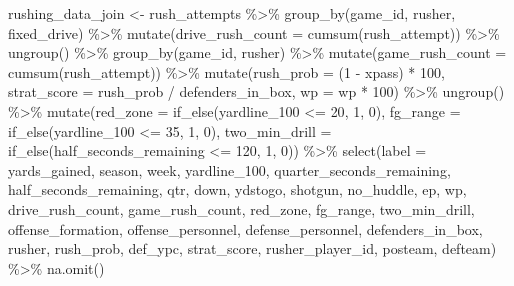 \documentclass[
  letterpaper,
]{krantz}
\newenvironment{Shaded}{\begin{snugshade}}{\end{snugshade}}
\newcommand{\AttributeTok}[1]{\textcolor[rgb]{0.40,0.45,0.13}{#1}}
\newcommand{\DecValTok}[1]{\textcolor[rgb]{0.68,0.00,0.00}{#1}}
\newcommand{\FunctionTok}[1]{\textcolor[rgb]{0.28,0.35,0.67}{#1}}
\newcommand{\NormalTok}[1]{\textcolor[rgb]{0.00,0.23,0.31}{#1}}
\newcommand{\OtherTok}[1]{\textcolor[rgb]{0.00,0.23,0.31}{#1}}
\newcommand{\SpecialCharTok}[1]{\textcolor[rgb]{0.37,0.37,0.37}{#1}}
\begin{document}
\begin{Shaded}
\begin{Highlighting}[]
\NormalTok{rushing\_data\_join }\OtherTok{\textless{}{-}}\NormalTok{ rush\_attempts }\SpecialCharTok{\%\textgreater{}\%}
  \FunctionTok{group\_by}\NormalTok{(game\_id, rusher, fixed\_drive) }\SpecialCharTok{\%\textgreater{}\%}
  \FunctionTok{mutate}\NormalTok{(}\AttributeTok{drive\_rush\_count =} \FunctionTok{cumsum}\NormalTok{(rush\_attempt)) }\SpecialCharTok{\%\textgreater{}\%}
  \FunctionTok{ungroup}\NormalTok{() }\SpecialCharTok{\%\textgreater{}\%}
  \FunctionTok{group\_by}\NormalTok{(game\_id, rusher) }\SpecialCharTok{\%\textgreater{}\%}
  \FunctionTok{mutate}\NormalTok{(}\AttributeTok{game\_rush\_count =} \FunctionTok{cumsum}\NormalTok{(rush\_attempt)) }\SpecialCharTok{\%\textgreater{}\%}
  \FunctionTok{mutate}\NormalTok{(}\AttributeTok{rush\_prob =}\NormalTok{ (}\DecValTok{1} \SpecialCharTok{{-}}\NormalTok{ xpass) }\SpecialCharTok{*} \DecValTok{100}\NormalTok{,}
         \AttributeTok{strat\_score =}\NormalTok{ rush\_prob }\SpecialCharTok{/}\NormalTok{ defenders\_in\_box,}
         \AttributeTok{wp =}\NormalTok{ wp }\SpecialCharTok{*} \DecValTok{100}\NormalTok{) }\SpecialCharTok{\%\textgreater{}\%}
  \FunctionTok{ungroup}\NormalTok{() }\SpecialCharTok{\%\textgreater{}\%}
  \FunctionTok{mutate}\NormalTok{(}\AttributeTok{red\_zone =} \FunctionTok{if\_else}\NormalTok{(yardline\_100 }\SpecialCharTok{\textless{}=} \DecValTok{20}\NormalTok{, }\DecValTok{1}\NormalTok{, }\DecValTok{0}\NormalTok{),}
         \AttributeTok{fg\_range =} \FunctionTok{if\_else}\NormalTok{(yardline\_100 }\SpecialCharTok{\textless{}=} \DecValTok{35}\NormalTok{, }\DecValTok{1}\NormalTok{, }\DecValTok{0}\NormalTok{),}
         \AttributeTok{two\_min\_drill =} \FunctionTok{if\_else}\NormalTok{(half\_seconds\_remaining }\SpecialCharTok{\textless{}=} \DecValTok{120}\NormalTok{, }\DecValTok{1}\NormalTok{, }\DecValTok{0}\NormalTok{)) }\SpecialCharTok{\%\textgreater{}\%}
  \FunctionTok{select}\NormalTok{(}\AttributeTok{label =}\NormalTok{ yards\_gained, season, week, yardline\_100,}
\NormalTok{         quarter\_seconds\_remaining, half\_seconds\_remaining,}
\NormalTok{         qtr, down, ydstogo, shotgun, no\_huddle,}
\NormalTok{         ep, wp, drive\_rush\_count, game\_rush\_count,}
\NormalTok{         red\_zone, fg\_range, two\_min\_drill,}
\NormalTok{         offense\_formation, offense\_personnel,}
\NormalTok{         defense\_personnel, defenders\_in\_box,}
\NormalTok{         rusher, rush\_prob, def\_ypc, strat\_score,}
\NormalTok{         rusher\_player\_id, posteam, defteam) }\SpecialCharTok{\%\textgreater{}\%}
  \FunctionTok{na.omit}\NormalTok{()}
\end{Highlighting}
\end{Shaded}
\end{document}

